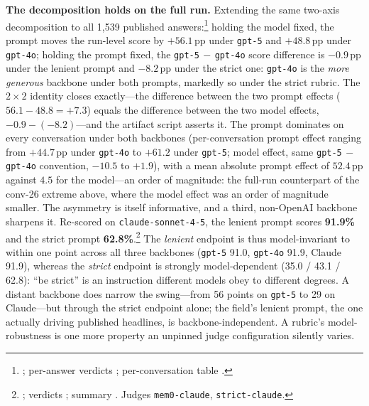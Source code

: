 \documentclass[11pt]{article}
\begin{document}
\textbf{The decomposition holds on the full run.} Extending the same two-axis decomposition to all 1{,}539 published answers:\footnote{; per-answer verdicts ; per-conversation table .} holding the model fixed, the prompt moves the run-level score by $+56.1$\,pp under \texttt{gpt-5} and $+48.8$\,pp under \texttt{gpt-4o}; holding the prompt fixed, the \texttt{gpt-5}$\,{-}\,$\texttt{gpt-4o} score difference is $-0.9$\,pp under the lenient prompt and $-8.2$\,pp under the strict one: \texttt{gpt-4o} is the \emph{more generous} backbone under both prompts, markedly so under the strict rubric. The $2\times2$ identity closes exactly---the difference between the two prompt effects ($56.1-48.8=+7.3$) equals the difference between the two model effects, $-0.9-(-8.2)$---and the artifact script asserts it. The prompt dominates on every conversation under both backbones (per-conversation prompt effect ranging from $+44.7$\,pp under \texttt{gpt-4o} to $+61.2$ under \texttt{gpt-5}; model effect, same \texttt{gpt-5}$\,{-}\,$\texttt{gpt-4o} convention, $-10.5$ to $+1.9$), with a mean absolute prompt effect of $52.4$\,pp against $4.5$ for the model---an order of magnitude: the full-run counterpart of the conv-26 extreme above, where the model effect was an order of magnitude smaller. The asymmetry is itself informative, and a third, non-OpenAI backbone sharpens it. Re-scored on \texttt{claude-sonnet-4-5}, the lenient prompt scores \textbf{91.9\%} and the strict prompt \textbf{62.8\%}.\footnote{; verdicts ; summary . Judges \texttt{mem0-claude}, \texttt{strict-claude}.} The \emph{lenient} endpoint is thus model-invariant to within one point across all three backbones (\texttt{gpt-5} 91.0, \texttt{gpt-4o} 91.9, Claude 91.9), whereas the \emph{strict} endpoint is strongly model-dependent (35.0 / 43.1 / 62.8): ``be strict'' is an instruction different models obey to different degrees. A distant backbone does narrow the swing---from 56 points on \texttt{gpt-5} to 29 on Claude---but through the strict endpoint alone; the field's lenient prompt, the one actually driving published headlines, is backbone-independent. A rubric's model-robustness is one more property an unpinned judge configuration silently varies.
\end{document}
